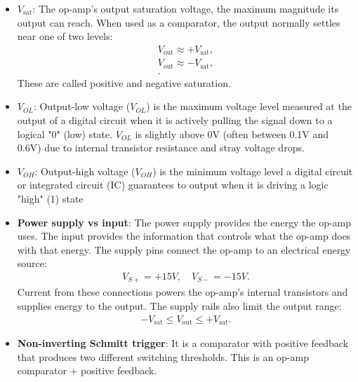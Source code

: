 \documentclass{report}
\begin{document}
\begin{itemize}
        \item \textbf{$V_{\text{sat}}$}:  The op-amp’s output saturation voltage, the maximum magnitude its output can reach.
            \bigbreak \noindent 
            When used as a comparator, the output normally settles near one of two levels:
            \begin{align*}
                V_{\text{out}} \approx +V_{\text{sat}}, \\
                V_{\text{out}} \approx -V_{\text{sat}}, \\
            .\end{align*}
            These are called positive and negative saturation.
        \item \textbf{$V_{OL}$}: Output-low voltage (\(V_{OL}\)) is the maximum voltage level measured at the output of a digital circuit when it is actively pulling the signal down to a logical "0" (low) state.
            \bigbreak \noindent 
            \(V_{OL}\) is slightly above 0V (often between 0.1V and 0.6V) due to internal transistor resistance and stray voltage drops.
        \item \textbf{$V_{OH}$}: Output-high voltage (\(V_{OH}\)) is the minimum voltage level a digital circuit or integrated circuit (IC) guarantees to output when it is driving a logic "high" (1) state
        \item \textbf{Power supply vs input}: The power supply provides the energy the op-amp uses. The input provides the information that controls what the op-amp does with that energy.
            \bigbreak \noindent 
            The supply pins connect the op-amp to an electrical energy source:
            \begin{align*}
                V_{S+} = +15V, \quad V_{S-} = -15V 
            .\end{align*}
            Current from these connections powers the op-amp’s internal transistors and supplies energy to the output.
            \bigbreak \noindent 
            The supply rails also limit the output range:
            \begin{align*}
                -V_{\text{sat}} \leq V_{\text{out}} \leq +V_{\text{sat}}
            .\end{align*}
        \item \textbf{Non-inverting Schmitt trigger}: It is a comparator with positive feedback that produces two different switching thresholds.
            \bigbreak \noindent 
            \bigbreak \noindent 
            This is an op-amp comparator + positive feedback.

\end{itemize}
\end{document}
